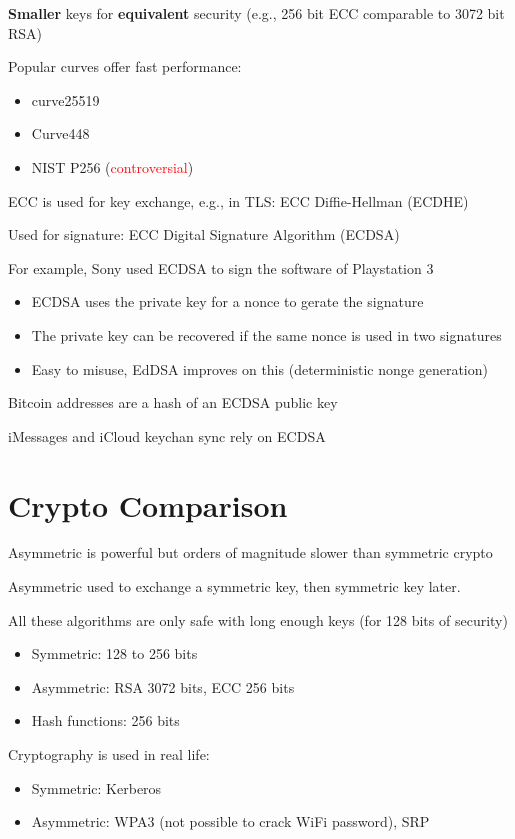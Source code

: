 \documentclass[11pt]{article}
\begin{document}
\textbf{Smaller} keys for \textbf{equivalent} security (e.g., 256 bit ECC comparable to 3072 bit RSA)

Popular curves offer fast performance:
\begin{itemize}
	\item curve25519
	\item Curve448
	\item NIST P256 (\textcolor{red}{controversial})
\end{itemize}

ECC is used for key exchange, e.g., in TLS: ECC Diffie-Hellman (ECDHE)

Used for signature: ECC Digital Signature Algorithm (ECDSA)

For example, Sony used ECDSA to sign the software of Playstation 3

\begin{itemize}
	\item ECDSA uses the private key for a nonce to gerate the signature
	\item The private key can be recovered if the same nonce is used in two signatures
	\item Easy to misuse, EdDSA improves on this (deterministic nonge generation)
\end{itemize}

Bitcoin addresses are a hash of an ECDSA public key

iMessages and iCloud keychan sync rely on ECDSA

\section*{Crypto Comparison}

Asymmetric is powerful but orders of magnitude slower than symmetric crypto

Asymmetric used to exchange a symmetric key, then symmetric key later.

All these algorithms are only safe with long enough keys (for 128 bits of security)

\begin{itemize}
	\item Symmetric: 128 to 256 bits
	\item Asymmetric: RSA 3072 bits, ECC 256 bits
	\item Hash functions: 256 bits
\end{itemize}

Cryptography is used in real life:

\begin{itemize}
	\item Symmetric: Kerberos
	\item Asymmetric: WPA3 (not possible to crack WiFi password), SRP
\end{itemize}
\end{document}
